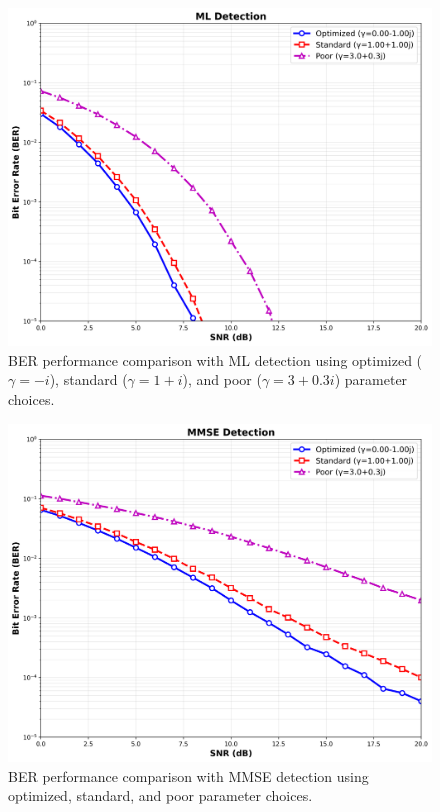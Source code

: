 \begin{figure}[!t]
\centering
\includegraphics[width=0.9\columnwidth]{figures/ml_detection.png} 
\caption{BER performance comparison with ML detection using optimized (\(\gamma = -i\)), standard (\(\gamma = 1+i\)), and poor (\(\gamma = 3+0.3i\)) parameter choices.}
\label{fig:ml_plot}
\end{figure}

\begin{figure}[!t]
\centering
\includegraphics[width=0.9\columnwidth]{figures/mmse_detection.png} 
\caption{BER performance comparison with MMSE detection using optimized, standard, and poor parameter choices.}
\label{fig:mmse_plot}
\end{figure}


